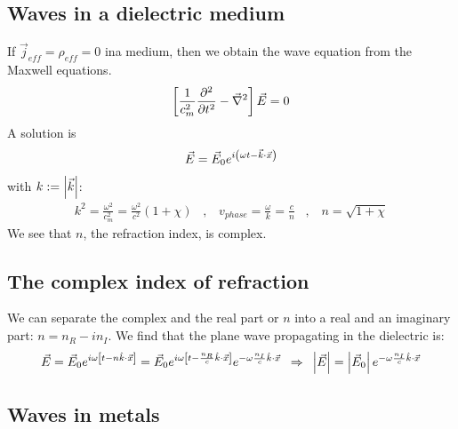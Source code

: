 \subsection{Waves in a dielectric medium}

If $\vec{j}_{eff} = \rho_{eff} = 0$ ina medium, then we obtain the wave equation
from the Maxwell equations.
\begin{align*}
    \left[ \frac{1}{c_m^2} \frac{\partial^2}{\partial t^2} - \vec{\nabla}^2 \right] \vec{E} = 0
\end{align*}
A solution is
\begin{align*}
    \vec{E} = \vec{E}_0 e^{i\left( \omega t - \vec{k} \cdot \vec{x} \right)}
\end{align*}
with $k := \left\vert \vec{k} \right\vert$:
\begin{align*}
    k^2 = \frac{\omega^2}{c_m^2} = \frac{\omega^2}{c^2} (1+\chi)
    \hspace{10pt} , \hspace{10pt}
    v_{phase} = \frac{\omega}{k} = \frac{c}{n}
    \hspace{10pt} , \hspace{10pt}
    n = \sqrt{1+\chi}
\end{align*}
We see that $n$, the refraction index, is complex.

\subsection{The complex index of refraction}
We can separate the complex and the real part or $n$ into a real and an
imaginary part: $n = n_R - i n_I$. We find that the plane wave propagating
in the dielectric is:
\begin{align*}
    \vec{E} = \vec{E}_0 e^{i \omega \left[ t - n \hat{k} \cdot \vec{x} \right]}
    = \vec{E}_0 e^{i \omega \left[ t - \frac{n_R}{c} \hat{k} \cdot \vec{x} \right]}
    e^{-\omega \frac{n_I}{c} \hat{k} \cdot \vec{x}}
    \hspace{5pt} \Rightarrow \hspace{5pt}
    \left\vert \vec{E} \right\vert = \left\vert \vec{E}_0 \right\vert e^{- \omega \frac{n_I}{c} \hat{k} \cdot \vec{x}}
\end{align*}

\subsection{Waves in metals}

